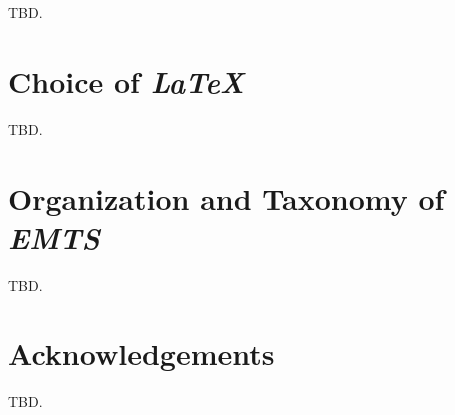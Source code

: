 TBD.

\section{Choice of \emph{\LaTeX{}}}
\label{ciov2:sclt0}

TBD.

\section{Organization and Taxonomy of \emph{EMTS}}
\label{ciov2:sote0}

TBD.

\section{Acknowledgements}
\label{ciov2:sack0}

TBD.



